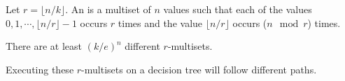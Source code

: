\begin{frame}{}
  \vspace{0.30cm}

  \begin{definition}[$r$-multiset]
    Let $r = \lfloor n/k \rfloor$.
    An  is a multiset of $n$ values such that
    each of the values $0, 1, \cdots, \lfloor n/r \rfloor - 1$ occurs $r$ times 
    and the value $\lfloor n/r \rfloor$ occurs ($n \mod r$) times.
  \end{definition}

  \begin{lemma}
    There are at least $(k/e)^{n}$ different $r$-multisets.
  \end{lemma}

  \begin{theorem}
    Executing these $r$-multisets on a decision tree will follow different paths.
  \end{theorem}
\end{frame}

